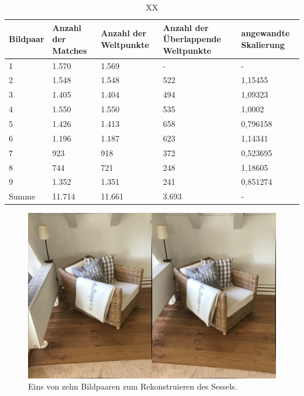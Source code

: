 \begin{table}
    \begin{tabularx}{\textwidth}{XXXXX}
        \toprule
        Bildpaar &  Anzahl der Matches & Anzahl der Weltpunkte & Anzahl der Überlappende Weltpunkte & angewandte Skalierung \\ 
        \midrule
        1 & 1.570 & 1.569 & -  & - \\
        2 & 1.548 & 1.548 & 522 & 1,15455 \\
        3 & 1.405 & 1.404 & 494 & 1,09323 \\
        4 & 1.550 & 1.550 & 535 & 1,0002 \\
        5 & 1.426 & 1.413 & 658 & 0,796158 \\
        6 & 1.196 & 1.187 & 623 & 1,14341 \\
        7 & 923 & 918 & 372 & 0,523695 \\
        8 & 744 & 721 & 248 & 1,18605 \\
        9 & 1.352 & 1.351 & 241 & 0,851274 \\
        \midrule
        Summe & 11.714 & 11.661 & 3.693 & - \\
        \bottomrule
    \end{tabularx}
    \caption{XX}
    \label{tab:chair-results}
\end{table}

\begin{figure}
    \includegraphics[width=\textwidth]{src/img/chair_first_pair.jpg}
    \caption{Eins von zehn Bildpaaren zum Rekonstruieren des Sessels.}
    \label{fig:chair-first-pair}
\end{figure}

